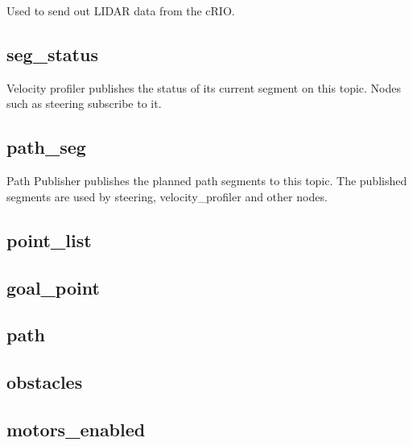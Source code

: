 \noindent Used to send out LIDAR data from the cRIO.

\subsection{seg\_status}
Velocity profiler publishes the status of its current segment on this
topic.  Nodes such as steering subscribe to it.

\subsection{path\_seg}
Path Publisher publishes the planned path segments to this topic.  The
published segments are used by steering, velocity\_profiler and other nodes.


\subsection{point\_list}
\subsection{goal\_point}
\subsection{path}
\subsection{obstacles}
\subsection{motors\_enabled}
